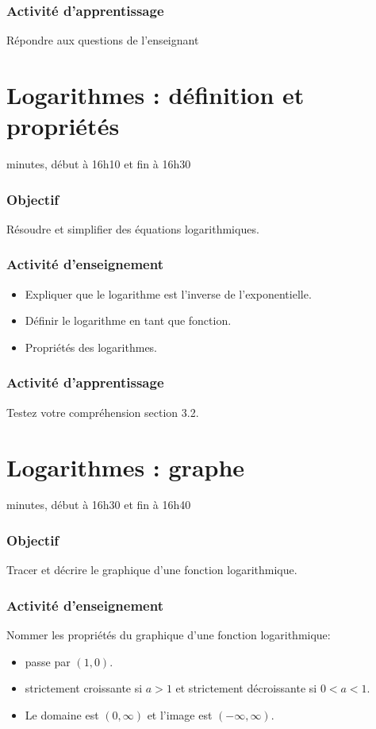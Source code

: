 \documentclass[12pt]{article}
\begin{document}
\subsubsection*{\faCalculator{} Activité d'apprentissage}
Répondre aux questions de l'enseignant


\clearpage
\section{Logarithmes : définition et propriétés}
 minutes, début à 16h10 et fin à 16h30
\subsubsection*{\faBullseye{} Objectif}
Résoudre et simplifier des équations logarithmiques.
\subsubsection*{\faChalkboardTeacher{} Activité d'enseignement}
\begin{itemize}
    \item Expliquer que le logarithme est l'inverse de l'exponentielle.
    \item Définir le logarithme en tant que fonction.
    \item Propriétés des logarithmes.
\end{itemize}
\subsubsection*{\faCalculator{} Activité d'apprentissage}
Testez votre compréhension section 3.2.


\clearpage
\section{Logarithmes : graphe}
 minutes, début à 16h30 et fin à 16h40
\subsubsection*{\faBullseye{} Objectif}
Tracer et décrire le graphique d'une fonction logarithmique.
\subsubsection*{\faChalkboardTeacher{} Activité d'enseignement}
Nommer les propriétés du graphique d'une fonction logarithmique:
\begin{itemize}
\item passe par $(1,0)$.
\item strictement croissante si $a > 1$ et strictement décroissante si $0 < a < 1$.
\item Le domaine est $(0, \infty)$ et l'image est $(-\infty, \infty)$.
\end{itemize}
\end{document}
